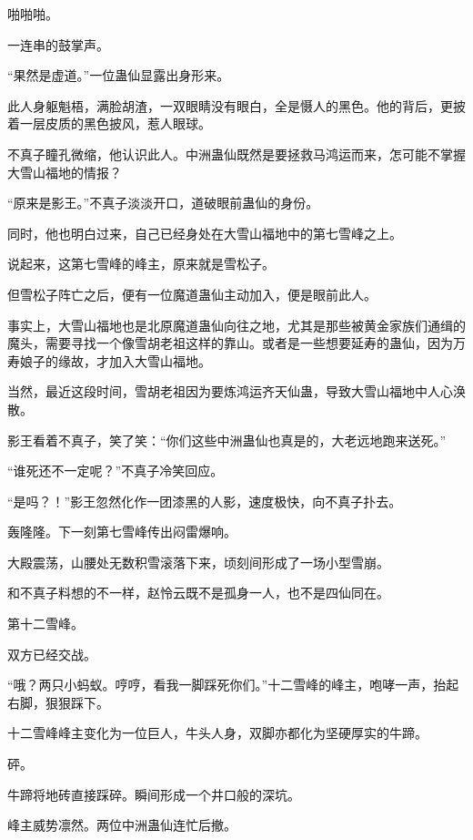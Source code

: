 
\begin{this_body}



啪啪啪。

一连串的鼓掌声。

“果然是虚道。”一位蛊仙显露出身形来。

此人身躯魁梧，满脸胡渣，一双眼睛没有眼白，全是慑人的黑色。他的背后，更披着一层皮质的黑色披风，惹人眼球。

不真子瞳孔微缩，他认识此人。中洲蛊仙既然是要拯救马鸿运而来，怎可能不掌握大雪山福地的情报？

“原来是影王。”不真子淡淡开口，道破眼前蛊仙的身份。

同时，他也明白过来，自己已经身处在大雪山福地中的第七雪峰之上。

说起来，这第七雪峰的峰主，原来就是雪松子。

但雪松子阵亡之后，便有一位魔道蛊仙主动加入，便是眼前此人。

事实上，大雪山福地也是北原魔道蛊仙向往之地，尤其是那些被黄金家族们通缉的魔头，需要寻找一个像雪胡老祖这样的靠山。或者是一些想要延寿的蛊仙，因为万寿娘子的缘故，才加入大雪山福地。

当然，最近这段时间，雪胡老祖因为要炼鸿运齐天仙蛊，导致大雪山福地中人心涣散。

影王看着不真子，笑了笑：“你们这些中洲蛊仙也真是的，大老远地跑来送死。”

“谁死还不一定呢？”不真子冷笑回应。

“是吗？！”影王忽然化作一团漆黑的人影，速度极快，向不真子扑去。

轰隆隆。下一刻第七雪峰传出闷雷爆响。

大殿震荡，山腰处无数积雪滚落下来，顷刻间形成了一场小型雪崩。

和不真子料想的不一样，赵怜云既不是孤身一人，也不是四仙同在。

第十二雪峰。

双方已经交战。

“哦？两只小蚂蚁。哼哼，看我一脚踩死你们。”十二雪峰的峰主，咆哮一声，抬起右脚，狠狠踩下。

十二雪峰峰主变化为一位巨人，牛头人身，双脚亦都化为坚硬厚实的牛蹄。

砰。

牛蹄将地砖直接踩碎。瞬间形成一个井口般的深坑。

峰主威势凛然。两位中洲蛊仙连忙后撤。


\end{this_body}
